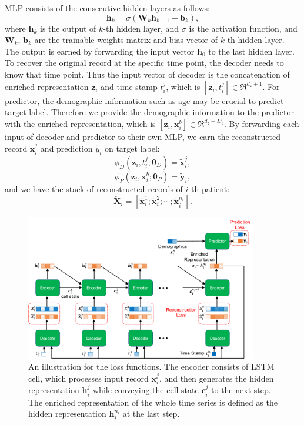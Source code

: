 MLP consists of the consecutive hidden layers as follows:
\begin{equation}
    \mathbf{h}_k = \sigma(\mathbf{W}_k\mathbf{h}_{k-1} + \mathbf{b}_k),
\end{equation}
where $\mathbf{h}_k$ is the output of $k$-th hidden layer, and $\sigma$ is the activation function, and $\mathbf{W}_k$, $\mathbf{b}_k$ are the trainable weights matrix and bias vector of $k$-th hidden layer. The output is earned by forwarding the input vector $\mathbf{h}_0$ to the last hidden layer. To recover the original record at the specific time point, the decoder needs to know that time point. Thus the input vector of decoder is the concatenation of enriched representation $\mathbf{z}_i$ and time stamp $t^j_i$, which is $[\mathbf{z}_i, t_i^j] \in \Re^{d_z + 1}$. For predictor, the demographic information such as age may be crucial to predict target label. Therefore we provide the demographic information to the predictor with the enriched representation, which is $[\mathbf{z}_i, \mathbf{x}_i^b] \in \Re^{d_z + D_b}$. By forwarding each input of decoder and predictor to their own MLP, we earn the reconstructed record $\tilde{\mathbf{x}}_i^j$ and prediction $\tilde{y}_i$ on target label:
\begin{equation}
    \phi_D(\mathbf{z}_i, t_i^j; \mathbf{\theta}_D) = \tilde{\mathbf{x}}_i^j,
\end{equation}
\begin{equation}
    \phi_P(\mathbf{z}_i, \mathbf{x}_i^b; \mathbf{\theta}_P) = \tilde{\mathbf{y}}_i,
\end{equation}
and we have the stack of reconstructed records of $i$-th patient:
\begin{equation}
    \tilde{\mathbf{X}}_i = [\tilde{\mathbf{x}}_i^1; \tilde{\mathbf{x}}_i^2; \cdots; \tilde{\mathbf{x}}_i^{n_i}].
\end{equation}
\begin{figure}[t]
    \centering
    \includegraphics[width=0.9\textwidth]{figures/autoencoder.pdf}
    \caption{An illustration for the loss functions. The encoder consists of LSTM cell, which processes input record $\mathbf{x}_i^j$, and then generates the hidden representation $\mathbf{h}_i^j$ while conveying the cell state $\mathbf{c}_i^j$ to the next step. The enriched representation of the whole time series is defined as the hidden representation $\mathbf{h}_i^{n_i}$ at the last step.} \label{fig: autoencoder}
\end{figure}
